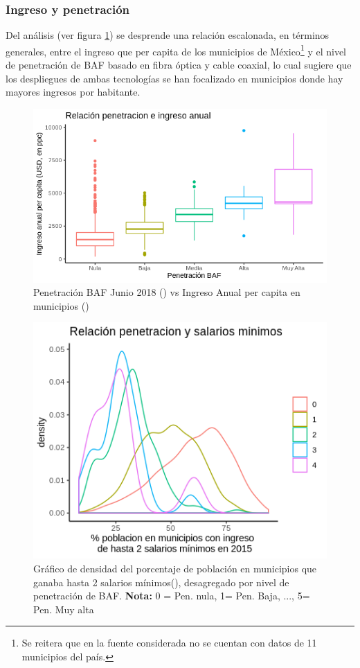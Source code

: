 \documentclass[9pt,twocolumn,twoside]{ilcss}
\begin{document}
\subsubsection{Ingreso y penetración}
Del análisis (ver figura \ref{fig:pen_income}) se desprende una relación escalonada, en términos generales, entre el ingreso que per capita de los municipios de México\footnote{Se reitera que en la fuente considerada no se cuentan con datos de 11 municipios del país.} y el nivel de penetración de BAF basado en fibra óptica y cable coaxial, lo cual sugiere que los despliegues de ambas tecnologías se han focalizado en municipios donde hay mayores ingresos por habitante.

\begin{figure}[tbhp]
	\centering
	\includegraphics[width=1.0\linewidth]{images/pen_income.png}
	\caption{Penetración BAF Junio 2018 (\cite{IFT2019BIT}) vs Ingreso Anual per capita en municipios (\cite{ONU2015}) }
	\label{fig:pen_income}
\end{figure}

\begin{figure}[tbhp]
	\centering
	\includegraphics[width=1.0\linewidth]{images/pen_smm.png}
	\caption{Gráfico de densidad del porcentaje de población en municipios que ganaba hasta 2 salarios mínimos(\cite{CONAPO2015}), desagregado por nivel de penetración de BAF. \textbf{Nota:} 0 = Pen. nula, 1= Pen. Baja, ..., 5= Pen. Muy alta}
	\label{fig:pen_smm}
\end{figure}
\end{document}
